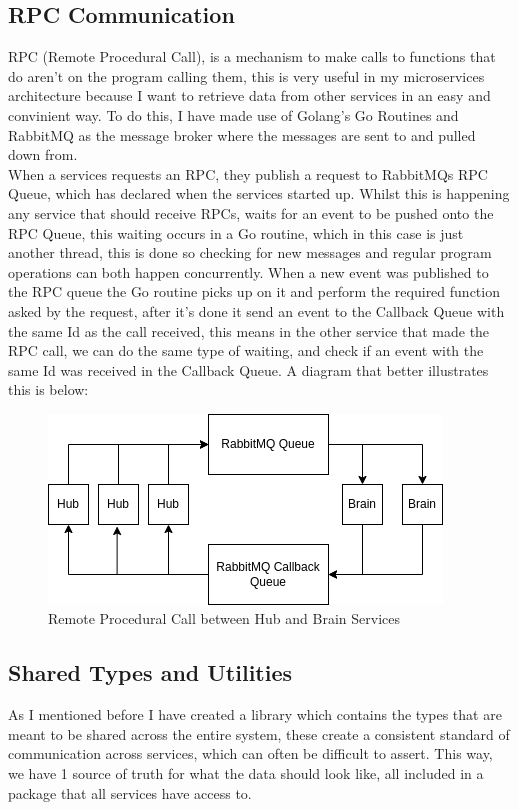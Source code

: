 \documentclass[titlepage]{article}
\begin{document}
\subsection{RPC Communication}
RPC (Remote Procedural Call), is a mechanism to make calls to functions that do aren't on the program calling them, this is very useful in my microservices architecture because I want to retrieve data from other services in an easy and convinient way. To do this, I have made use of Golang's Go Routines and RabbitMQ as the message broker where the messages are sent to and pulled down from. \\

When a services requests an RPC, they publish a request to RabbitMQs RPC Queue, which has declared when the services started up. Whilst this is happening any service that should receive RPCs, waits for an event to be pushed onto the RPC Queue, this waiting occurs in a Go routine, which in this case is just another thread, this is done so checking for new messages and regular program operations can both happen concurrently. When a new event was published to the RPC queue the Go routine picks up on it and perform the required function asked by the request, after it's done it send an event to the Callback Queue with the same Id as the call received, this means in the other service that made the RPC call, we can do the same type of waiting, and check if an event with the same Id was received in the Callback Queue. A diagram that better illustrates this is below:

\begin{figure}
\caption{Remote Procedural Call between Hub and Brain Services}
\centering
\includegraphics[width=\textwidth]{RPC.png}
\end{figure}
\pagebreak

\subsection{Shared Types and Utilities}
As I mentioned before I have created a library which contains the types that are meant to be shared across the entire system, these create a consistent standard of communication across services, which can often be difficult to assert. This way, we have 1 source of truth for what the data should look like, all included in a package that all services have access to. \\
\end{document}
